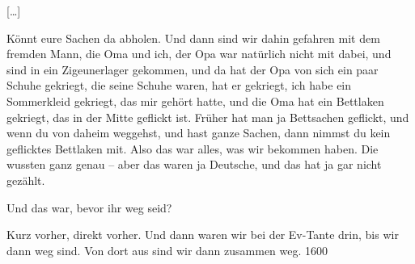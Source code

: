 \documentclass[ngerman,]{article}
\providecommand{\tightlist}{%
  \setlength{\itemsep}{0pt}\setlength{\parskip}{0pt}}
\begin{document}
\begin{multicols}{2}
{[}\ldots{}{]}

\begin{description}
\tightlist
\item[Käthe]
Könnt eure Sachen da abholen. Und dann sind wir dahin gefahren mit dem
fremden Mann, die Oma und ich, der Opa war natürlich nicht mit dabei,
und sind in ein Zigeunerlager gekommen, und da hat der Opa von sich ein
paar\,Schuhe gekriegt, die seine Schuhe waren, hat er gekriegt, ich habe
ein Sommerkleid gekriegt, das mir gehört hatte, und die Oma hat ein
Bettlaken gekriegt, das in der Mitte geflickt ist. Früher hat man ja
Bettsachen geflickt, und wenn du von daheim weggehst, und hast ganze
Sachen, dann nimmst du kein geflicktes Bettlaken mit. Also das war
alles, was wir bekommen haben. Die wussten ganz genau – aber das waren
ja Deutsche, und das hat ja gar nicht gezählt.
\item[Ruth]
Und das war, bevor ihr weg seid?
\item[Käthe]
Kurz vorher, direkt vorher. Und dann waren wir bei der Ev-Tante drin,
bis wir dann weg sind. Von dort aus sind wir dann zusammen weg. 1600
\end{description}
\end{multicols}
\end{document}
